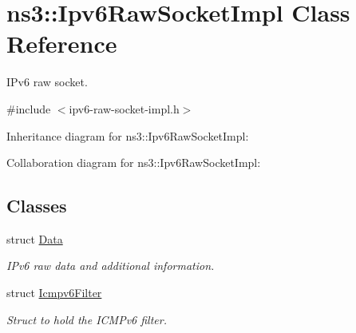 \hypertarget{classns3_1_1Ipv6RawSocketImpl}{}\section{ns3\+:\+:Ipv6\+Raw\+Socket\+Impl Class Reference}
\label{classns3_1_1Ipv6RawSocketImpl}


I\+Pv6 raw socket.  




{\ttfamily \#include $<$ipv6-\/raw-\/socket-\/impl.\+h$>$}



Inheritance diagram for ns3\+:\+:Ipv6\+Raw\+Socket\+Impl\+:


Collaboration diagram for ns3\+:\+:Ipv6\+Raw\+Socket\+Impl\+:
\subsection*{Classes}
\begin{DoxyCompactItemize}
\item 
struct \hyperlink{structns3_1_1Ipv6RawSocketImpl_1_1Data}{Data}
\begin{DoxyCompactList}\small\item\em I\+Pv6 raw data and additional information. \end{DoxyCompactList}\item 
struct \hyperlink{structns3_1_1Ipv6RawSocketImpl_1_1Icmpv6Filter}{Icmpv6\+Filter}
\begin{DoxyCompactList}\small\item\em Struct to hold the I\+C\+M\+Pv6 filter. \end{DoxyCompactList}\end{DoxyCompactItemize}

